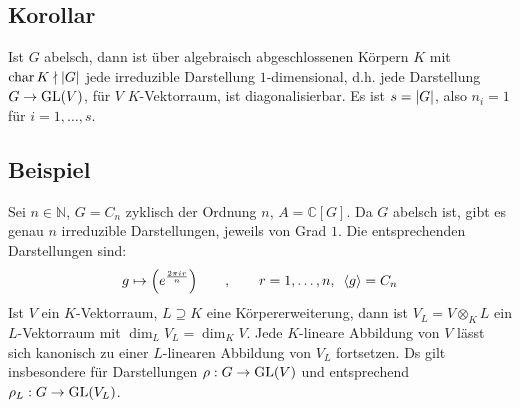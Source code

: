 \subsection{Korollar} %
\label{sub:416}
Ist $G$ abelsch, dann ist über algebraisch abgeschlossenen Körpern $K$ mit $\Char K \nmid \abs*{G}$ jede irreduzible Darstellung $1$-dimensional, d.h. jede Darstellung
$G \to \GL(V)$, für $V$ $K$-Vektorraum, ist diagonalisierbar.
Es ist $s= \abs*{G}$, also $n_i=1$ für $i=1,\ldots ,s$. \bewende

\subsection{Beispiel} %
\label{sub:417}
Sei $n \in \mathds{N}$, $G=C_n$ zyklisch der Ordnung $n$, $A=\mathds{C}[G]$. Da $G$ abelsch ist, gibt es genau $n$ irreduzible Darstellungen, jeweils von Grad $1$. Die
entsprechenden Darstellungen sind:
\[
	g \mapsto \enbrace*{e^{\frac{2 \pi i r}{n}}} \qquad , \qquad r=1, \ldots ,n, \enspace\langle g \rangle = C_n
\]
Ist $V$ ein $K$-Vektorraum, $L \supseteq K$ eine Körpererweiterung, dann ist $V_L = V \otimes_K L$ ein $L$-Vektorraum mit $\dim_L V_L = \dim_K V$. Jede $K$-lineare Abbildung
von $V$ lässt sich kanonisch zu einer $L$-linearen Abbildung von $V_L$ fortsetzen. Ds gilt insbesondere für Darstellungen $\rho : G \to \GL(V)$ und entsprechend
$\rho_L : G \to \GL(V_L)$.

